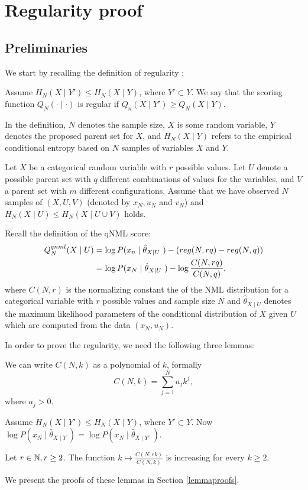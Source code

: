 \section{Regularity proof}

\subsection{Preliminaries}
We start by recalling the definition of regularity \citep{Suzuki2017}:

\begin{definition}
Assume $H_N(X \mid Y') \leq H_N(X \mid Y)$, where $Y' \subset Y.$ We say that the scoring function $Q_N(\cdot \mid \cdot)$ is regular if $Q_n(X \mid Y') \geq Q_N(X \mid Y)$.
\end{definition}
In the definition, $N$ denotes the sample size, $X$ is some random variable, $Y$ denotes the proposed parent set for $X$, and $H_N(X \mid Y)$ refers to the empirical conditional entropy based on $N$ samples of variables $X$ and $Y$.

Let $X$ be a categorical random variable with $r$ possible values. Let $U$ denote a possible parent set with $q$ different combinations of values for the variables, and $V$ a parent set with $m$ different configurations. Assume that we have observed $N$ samples of $(X,U,V)$ (denoted by $x_N,u_N$ and $v_N$) and $H_N(X \mid U) \leq H_N(X \mid U \cup V)$ holds.

Recall the definition of the qNML score:
\begin{align*}
Q^{qnml}_N(X\mid U) &= \log P(x_n \mid \hat{\theta}_{X\mid U} \ ) - \left( reg(N,rq) - reg(N,q) \right) \\
&= \log P(x_N \mid \hat{\theta}_{X\mid U} \ ) - \log \frac{C(N,rq)}{C(N,q)},
\end{align*}where $C(N,r)$ is the normalizing constant the of the NML distribution for a categorical variable with $r$ possible values and sample size $N$ and $ \hat{\theta}_{X\mid U}$ denotes the maximum likelihood parameters of the conditional distribution of $X$ given $U$ which are computed from the data $(x_N,u_N)$. 


In order to prove the regularity, we need the following three lemmas:
\begin{lemma}\label{Cpolynom} We can write $C(N,k)$ as a polynomial of $k$, formally
$$
C(N,k) = \sum_{j=1}^N a_j k^j,
$$where $a_j > 0$. 
\end{lemma}
\begin{lemma}\label{MLterms}
Assume $H_N(X \mid Y') \leq H_N(X \mid Y)$, where $Y' \subset Y$. Now $\log P(x_N \mid \hat{\theta}_{X\mid Y} \ ) = \log P(x_N \mid \hat{\theta}_{X\mid Y'} \ )$.
\end{lemma}
\begin{lemma}\label{increasing}
Let $r \in \mathbb{N}, r \geq 2$.  The function $k \mapsto \frac{C(N,rk)}{C(N,k)}$ is increasing for every $k \geq 2$.
\end{lemma}
\noindent We present the proofs of these lemmas in Section \ref{lemmaproofs}.  

